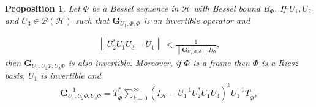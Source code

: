 \documentclass{birkjour}
\newtheorem{prop}[thm]{Proposition}
\theoremstyle{definition}
\theoremstyle{remark}
\numberwithin{equation}{section}
\newcommand{\BL}[1]{
{\mathcal B} \left( #1 \right)
}
\begin{document}
\begin{prop}
Let $\Phi$ be a Bessel sequence in $\mathcal{H}$  with Bessel
bound $B_{\Phi}$. If $U_{1},U_{2}$ and $U_{3}\in \BL{\mathcal{H}}$ such
that $\mathbf{G}_{U_{1},\Phi,\Phi}$ is an invertible operator  and

 \begin{eqnarray}\label{2}
 \left\|U_{2}^{*}U_{1}U_{3}-U_{1}\right\|<\frac{1}{\left\|\mathbf{G}_{U_{1},\Phi,\Phi}^{-1}\right\|B_{\Phi}},
 \end{eqnarray}
 then $\mathbf{G}_{U_{1}, U_{2}\Phi,U_{3}\Phi}$ is also invertible. Moreover, if $\Phi$ is a frame then $\Phi$ is a Riesz basis, $U_{1}$ is invertible and
 \begin{eqnarray*}
  \mathbf{G}_{U_{1},U_2\Phi,U_3\Phi}^{-1}=T_{\widetilde{\Phi}}^{*}\sum_{k=0}^{\infty}
  \left(I_{\mathcal{H}}-U_{1}^{-1}U_{2}^{*}U_{1}U_{3}\right)^{k}U_{1}^{-1}T_{\widetilde{\Phi}},
 \end{eqnarray*}
\end{prop}
\end{document}
